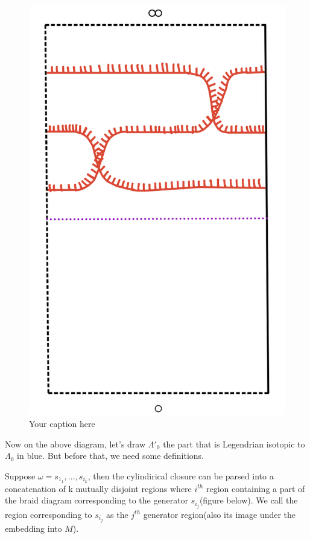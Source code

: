 \begin{figure}[H] 
    \centering
    \includegraphics[scale = 0.95]{diagrams/natural_alternating_diagrams/5.png}
    \caption{Your caption here}
    \label{fig:your-label}
\end{figure}

Now on the above diagram, let's draw $\Lambda'_0$ the part that is Legendrian isotopic to $\Lambda_0$ in blue. But before that, we need some definitions.

\begin{definition}
Suppose $\omega = s_{1_1},..., s_{i_k}$, then the cylindirical closure can be parsed into a concatenation of k mutually disjoint regions where $i^{th}$ region containing a part of the braid diagram corresponding to the generator $s_{i_j}$(figure below). We call the region corresponding to $s_{i_j}$ as the $j^{th}$ generator region(also its image under the embedding into $M$).
\end{definition}

